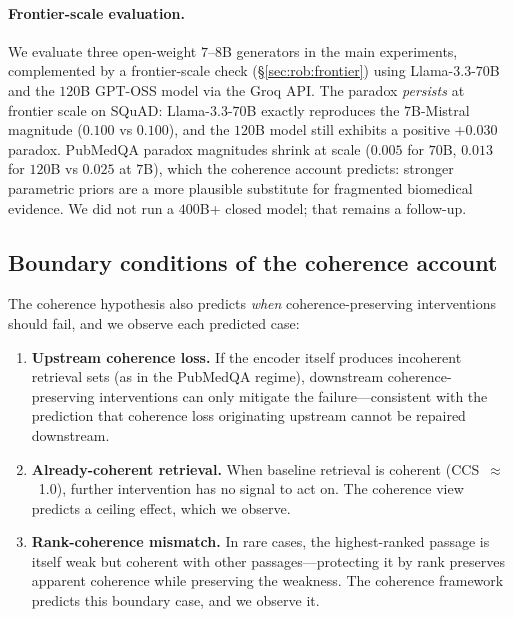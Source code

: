 \paragraph{Frontier-scale evaluation.}
\label{sec:limitations:frontier}
We evaluate three open-weight $7$--$8$B generators in the main
experiments, complemented by a frontier-scale check
(\S\ref{sec:rob:frontier}) using Llama-$3.3$-$70$B and the $120$B
GPT-OSS model via the Groq API. The paradox \emph{persists} at frontier
scale on SQuAD: Llama-$3.3$-$70$B exactly reproduces the $7$B-Mistral
magnitude ($0.100$ vs $0.100$), and the $120$B model still exhibits a
positive $+0.030$ paradox. PubMedQA paradox magnitudes shrink at scale
($0.005$ for $70$B, $0.013$ for $120$B vs $0.025$ at $7$B), which the
coherence account predicts: stronger parametric priors are a more
plausible substitute for fragmented biomedical evidence. We did not
run a $400$B+ closed model; that remains a follow-up.

\subsection{Boundary conditions of the coherence account}

The coherence hypothesis also predicts \emph{when} coherence-preserving
interventions should fail, and we observe each predicted case:

\begin{enumerate}
  \item \textbf{Upstream coherence loss.} If the encoder itself produces
        incoherent retrieval sets (as in the PubMedQA regime),
        downstream coherence-preserving interventions can only mitigate
        the failure---consistent with the prediction that coherence loss
        originating upstream cannot be repaired downstream.

  \item \textbf{Already-coherent retrieval.} When baseline retrieval is
        coherent (CCS~$\approx$~1.0), further intervention has no signal
        to act on. The coherence view predicts a ceiling effect, which
        we observe.

  \item \textbf{Rank-coherence mismatch.} In rare cases, the
        highest-ranked passage is itself weak but coherent with other
        passages---protecting it by rank preserves apparent coherence
        while preserving the weakness. The coherence framework predicts
        this boundary case, and we observe it.
\end{enumerate}

